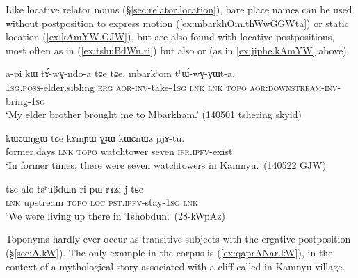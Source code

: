 Like locative relator nouns (§\ref{sec:relator.location}), bare place names can be used without postposition to express motion (\ref{ex:mbarkhOm.thWwGGWta}) or static location (\ref{ex:kAmYW.GJW}), but are also found with locative postpositions, most often  as in (\ref{ex:tshuBdWn.ri}) but also  or  (as in \ref{ex:jiphe.kAmYW} above).

\begin{exe}
\ex \label{ex:mbarkhOm.thWwGGWta}
 \gll a-pi kɯ tɤ́-wɣ-ndo-a tɕe tɕe, mbarkʰom tʰɯ́-wɣ-ɣɯt-a, \\
 \textsc{1sg}.\textsc{poss}-elder.sibling \textsc{erg} \textsc{aor}-\textsc{inv}-take-\textsc{1sg} \textsc{lnk} \textsc{lnk} \textsc{topo}  \textsc{aor}:\textsc{downstream}-\textsc{inv}-bring-\textsc{1sg} \\
\glt `My elder brother brought me to Mbarkham.' (140501 tshering skyid) 
\end{exe}

\begin{exe}
\ex \label{ex:kAmYW.GJW}
 \gll kɯɕɯŋgɯ tɕe kɤmɲɯ ɣɟɯ kɯɕnɯz pjɤ-tu. \\
 former.days \textsc{lnk} \textsc{topo} watchtower seven \textsc{ifr}.\textsc{ipfv}-exist \\
 \glt `In former times, there were seven watchtowers in Kamnyu.' (140522 GJW)
\end{exe}

\begin{exe}
\ex \label{ex:tshuBdWn.ri}
 \gll tɕe alo tsʰuβdɯn ri pɯ-rɤʑi-j tɕe \\
 \textsc{lnk} upstream \textsc{topo} \textsc{loc} \textsc{pst}.\textsc{ipfv}-stay-\textsc{1sg} \textsc{lnk} \\
 \glt `We were living up there in Tshobdun.' (28-kWpAz) 
\end{exe}

Toponyms hardly ever occur as transitive subjects with the ergative postposition (§\ref{sec:A.kW}). The only example in the corpus is (\ref{ex:qaprANar.kW}), in the context of a mythological story associated with a cliff called  in Kamnyu village.

